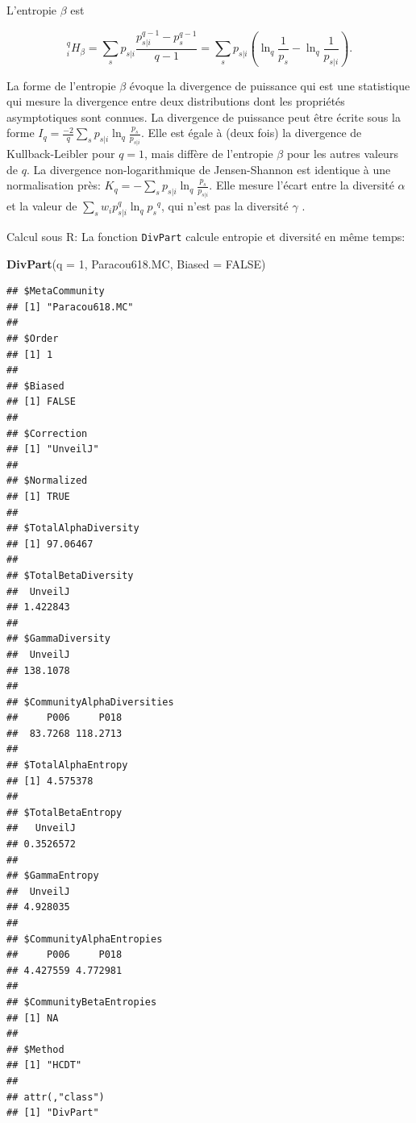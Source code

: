 \documentclass[
  11pt,
  french,
  a4paper,
  extrafontsizes,onecolumn,openright
  ]{memoir}
\newenvironment{Shaded}{\begin{snugshade}}{\end{snugshade}}
\newcommand{\DataTypeTok}[1]{\textcolor[rgb]{0.13,0.29,0.53}{#1}}
\newcommand{\DecValTok}[1]{\textcolor[rgb]{0.00,0.00,0.81}{#1}}
\newcommand{\KeywordTok}[1]{\textcolor[rgb]{0.13,0.29,0.53}{\textbf{#1}}}
\newcommand{\NormalTok}[1]{#1}
\newcommand{\OtherTok}[1]{\textcolor[rgb]{0.56,0.35,0.01}{#1}}
\begin{document}
L'entropie \(\beta\) est

\begin{equation}
  \label{eq:Hqbeta}
  ^{q}_{i}\!H_{\beta} 
  = \sum_s{p_{s|i}\frac{p^{q-1}_{s|i}-p^{q-1}_s}{q-1}}
  = \sum_s{p_{s|i}\left(\ln_q\frac{1}{p_s}-\ln_q\frac{1}{p_{s|i}}\right)}.
\end{equation}

La forme de l'entropie \(\beta\) évoque la divergence de puissance \autocite{Cressie1984} qui est une statistique qui mesure la divergence entre deux distributions dont les propriétés asymptotiques sont connues.
La divergence de puissance peut être écrite sous la forme \(I_q= \frac{-2}{q} \sum_s{p_{s|i} \ln_q\frac{p_{s}}{p_{s|i}}}\).
Elle est égale à (deux fois) la divergence de Kullback-Leibler pour \(q=1\), mais diffère de l'entropie \(\beta\) pour les autres valeurs de \(q\).
La divergence non-logarithmique de Jensen-Shannon \autocite{Lamberti2003} est identique à une normalisation près: \(K_q= -\sum_s{p_{s|i} \ln_q\frac{p_{s}}{p_{s|i}}}\).
Elle mesure l'écart entre la diversité \(\alpha\) et la valeur de \(\sum_s{w_i p^q_{s|i} \ln_q{p_s}^q}\), qui n'est pas la diversité \(\gamma\) \autocite{Marcon2014a}.

Calcul sous R: La fonction \texttt{DivPart} calcule entropie et diversité en même temps:

\scriptsize

\begin{Shaded}
\begin{Highlighting}[]
\KeywordTok{DivPart}\NormalTok{(}\DataTypeTok{q =} \DecValTok{1}\NormalTok{, Paracou618.MC, }\DataTypeTok{Biased =} \OtherTok{FALSE}\NormalTok{)}
\end{Highlighting}
\end{Shaded}

\begin{verbatim}
## $MetaCommunity
## [1] "Paracou618.MC"
## 
## $Order
## [1] 1
## 
## $Biased
## [1] FALSE
## 
## $Correction
## [1] "UnveilJ"
## 
## $Normalized
## [1] TRUE
## 
## $TotalAlphaDiversity
## [1] 97.06467
## 
## $TotalBetaDiversity
##  UnveilJ 
## 1.422843 
## 
## $GammaDiversity
##  UnveilJ 
## 138.1078 
## 
## $CommunityAlphaDiversities
##     P006     P018 
##  83.7268 118.2713 
## 
## $TotalAlphaEntropy
## [1] 4.575378
## 
## $TotalBetaEntropy
##   UnveilJ 
## 0.3526572 
## 
## $GammaEntropy
##  UnveilJ 
## 4.928035 
## 
## $CommunityAlphaEntropies
##     P006     P018 
## 4.427559 4.772981 
## 
## $CommunityBetaEntropies
## [1] NA
## 
## $Method
## [1] "HCDT"
## 
## attr(,"class")
## [1] "DivPart"
\end{verbatim}
\end{document}
